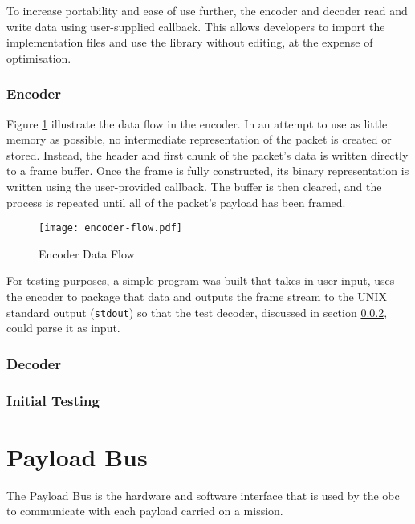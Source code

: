 To increase portability and ease of use further, the encoder and decoder read
and write data using user-supplied callback. This allows developers to import
the implementation files and use the library without editing, at the expense of
optimisation.

\subsubsection{Encoder}

Figure \ref{fig:encoder-flow} illustrate the data flow in the encoder.
In an attempt to use as little memory as possible, no intermediate
representation of the packet is created or stored. Instead, the header and
first chunk of the packet's data is written directly to a frame buffer. Once
the frame is fully constructed, its binary representation is written using the
user-provided callback. The buffer is then cleared, and the process is repeated
until all of the packet's payload has been framed. 

\begin{figure}[H]
\texttt{[image: encoder-flow.pdf]}
\centering
\caption{Encoder Data Flow}
\label{fig:encoder-flow}
\end{figure}

For testing purposes, a simple program was built that takes in user input,
uses the encoder to package that data and outputs the frame stream to the
UNIX standard output (\texttt{stdout}) so that the test decoder, discussed in
section \ref{sssec:rtx-decoder}, could parse it as input.


\subsubsection{Decoder}
\label{sssec:rtx-decoder}

\subsubsection{Initial Testing}

\section{Payload Bus}
\label{sec:payload-bus}

The Payload Bus is the hardware and software interface that is used by the
\acrfull{obc} to communicate with each payload carried on a mission.

